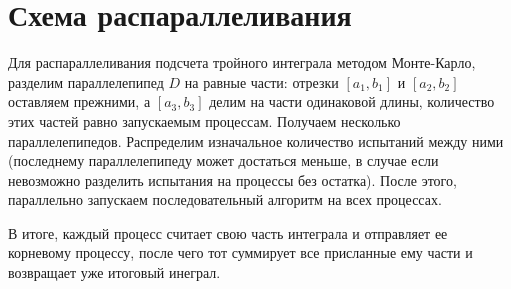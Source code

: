 \documentclass{report}
\begin{document}
\section*{Схема распараллеливания}
\par Для распараллеливания подсчета тройного интеграла методом Монте-Карло, разделим параллелепипед $D$ на равные части: отрезки $[a_1,b_1]$ и $[a_2,b_2]$ оставляем прежними, а $[a_3,b_3]$ делим на части одинаковой длины, количество этих частей равно запускаемым процессам. Получаем несколько параллелепипедов. Распределим изначальное количество испытаний между ними (последнему параллелепипеду может достаться меньше, в случае если невозможно разделить испытания на процессы без остатка). После этого, параллельно запускаем последовательный алгоритм на всех процессах.
\par В итоге, каждый процесс считает свою часть интеграла и отправляет ее корневому процессу, после чего тот суммирует все присланные ему части и возвращает уже итоговый инеграл.
\newpage

\end{document}

